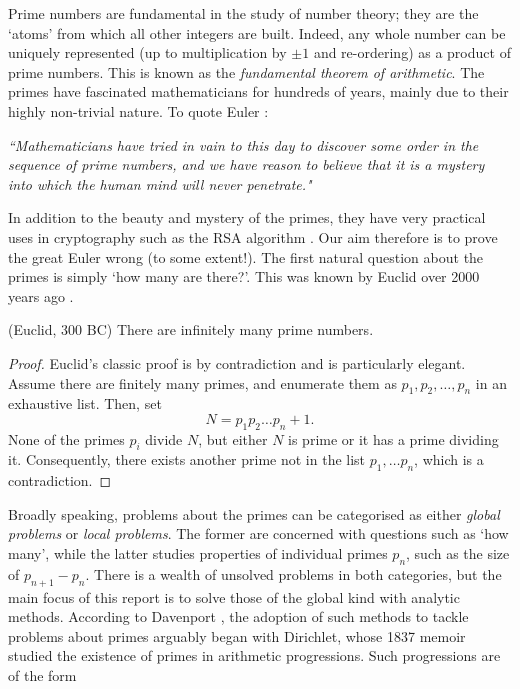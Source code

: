 Prime numbers are fundamental in the study of number theory; they are the `atoms' from which all other integers are built. Indeed, any whole number can be uniquely represented (up to multiplication by $\pm 1$ and re-ordering) as a product of prime numbers. This is known as the \textit{fundamental theorem of arithmetic}. The primes have fascinated mathematicians for hundreds of years, mainly due to their highly non-trivial nature. To quote Euler \cite{simmons_2019}: 
\begin{Quote}
\label{EulerQuote}
    \textit{``Mathematicians have tried in vain to this day to discover some order in the sequence of prime numbers, and we have reason to believe that it is a mystery into which the human mind will never penetrate."}
\end{Quote}
In addition to the beauty and mystery of the primes, they have very practical uses in cryptography such as the RSA algorithm \cite{Riesel1994}. Our aim therefore is to prove the great Euler wrong (to some extent!). The first natural question about the primes is simply `how many are there?'. This was known by Euclid over 2000 years ago \cite{ore_2012}.
\begin{proposition}
(Euclid, 300 BC) There are infinitely many prime numbers.
\end{proposition}
\begin{proof}
Euclid's classic proof is by contradiction and is particularly elegant. Assume there are finitely many primes, and enumerate them as $p_1, p_2, \dots, p_n$ in an exhaustive list. Then, set
\begin{equation}
    N = p_1 p_2 \dots p_n + 1. \nonumber
\end{equation}
None of the primes $p_i$ divide $N$, but either $N$ is prime or it has a prime dividing it. Consequently, there exists another prime not in the list $p_1, \dots p_n$, which is a contradiction.
\end{proof}
Broadly speaking, problems about the primes can be categorised as either \textit{global problems} or \textit{local problems}. The former are concerned with questions such as `how many', while the latter studies properties of individual primes $p_n$, such as the size of $p_{n+1} - p_n$. There is a wealth of unsolved problems in both categories, but the main focus of this report is to solve those of the global kind with analytic methods. According to Davenport \cite[p.~1]{davenport}, the adoption of such methods to tackle problems about primes arguably began with Dirichlet, whose 1837 memoir studied the existence of primes in arithmetic progressions. Such progressions are of the form 

